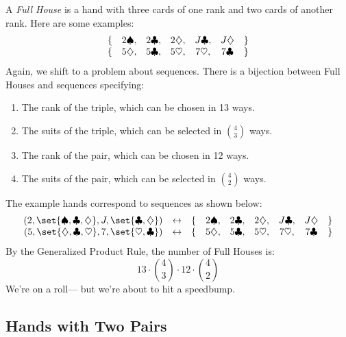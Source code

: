 A \emph{Full House} is a hand with three cards of one rank and
two cards of another rank.  Here are some examples:
%
\[
\begin{array}{rcccccl}
\{ & 2 \spadesuit, & 2 \clubsuit, & 2 \diamondsuit, & J \clubsuit, & J \diamondsuit & \} \\
\{ & 5 \diamondsuit, & 5 \clubsuit, & 5 \heartsuit, & 7 \heartsuit, & 7 \clubsuit & \}
\end{array}
\]
%
Again, we shift to a problem about sequences.  There is a bijection
between Full Houses and sequences specifying:
%
\begin{enumerate}
\item The rank of the triple, which can be chosen in 13 ways.
\item The suits of the triple, which can be selected in $\binom{4}{3}$ ways.
\item The rank of the pair, which can be chosen in 12 ways.
\item The suits of the pair, which can be selected in $\binom{4}{2}$ ways.
\end{enumerate}
%
The example hands correspond to sequences as shown below:
%
\[
\begin{array}{rcrcccccl}
(2, \set{\spa, \clu, \dia}, J, \set{\clu, \dia}) & \leftrightarrow &
    \{ & 2 \spa, & 2 \clu, & 2 \dia, & J \clu, & J \dia & \} \\
(5, \set{\dia, \clu, \hea}, 7, \set{\hea, \clu}) & \leftrightarrow &
    \{ & 5 \dia, & 5 \clu, & 5 \hea, & 7 \hea, & 7 \clu & \}
\end{array}
\]
%
By the Generalized Product Rule, the number of Full Houses is:
%
\[
13 \cdot \binom{4}{3} \cdot 12 \cdot \binom{4}{2}
\]
%
We're on a roll--- but we're about to hit a speedbump.

\subsection{Hands with Two Pairs}

